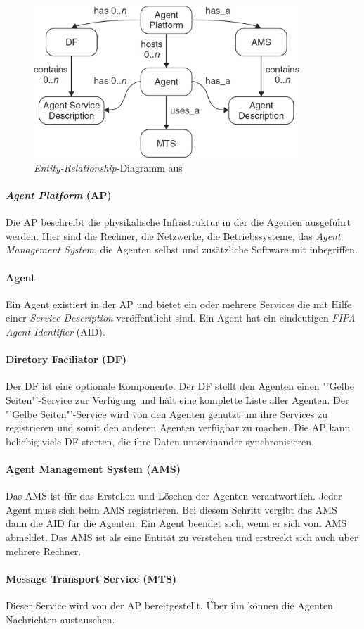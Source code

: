 \begin{figure}[H]
    \includegraphics[width=10cm]{images/jade_structure.png}
    \centering
    \caption{\textit{Entity-Relationship}-Diagramm aus \cite{book:jade}}
    \label{fig:jade_structure}
\end{figure}

\paragraph{\textit{Agent Platform} (AP)}
Die AP beschreibt die physikalische Infrastruktur in der die Agenten ausgeführt werden. Hier sind die Rechner, die Netzwerke, die Betriebssysteme, das \textit{Agent Management System}, die Agenten selbst und zusätzliche Software mit inbegriffen.

\paragraph{Agent}
Ein Agent existiert in der AP und bietet ein oder mehrere Services die mit Hilfe einer \textit{Service Description} veröffentlicht sind. Ein Agent hat ein eindeutigen \textit{FIPA Agent Identifier} (AID).  

\paragraph{Diretory Faciliator (DF)}
Der DF ist eine optionale Komponente. Der DF stellt den Agenten einen "'Gelbe Seiten"'-Service zur Verfügung und hält eine komplette Liste aller Agenten. Der "'Gelbe Seiten"'-Service wird von den Agenten genutzt um ihre Services zu registrieren und somit den anderen Agenten verfügbar zu machen. Die AP kann beliebig viele DF starten, die ihre Daten untereinander synchronisieren.

\paragraph{Agent Management System (AMS)}
Das AMS ist für das Erstellen und Löschen der Agenten verantwortlich. Jeder Agent muss sich beim AMS registrieren. Bei diesem Schritt vergibt das AMS dann die AID für die Agenten. Ein Agent beendet sich, wenn er sich vom AMS abmeldet. Das AMS ist als eine Entität zu verstehen und erstreckt sich auch über mehrere Rechner.

\paragraph{Message Transport Service (MTS)} Dieser Service wird von der AP bereitgestellt. Über ihn können die Agenten Nachrichten austauschen.